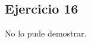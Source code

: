 \documentclass[10pt,a4paper]{article}
\begin{document}
\subsection{Ejercicio 16} No lo pude demostrar.
%
%
\end{document}
